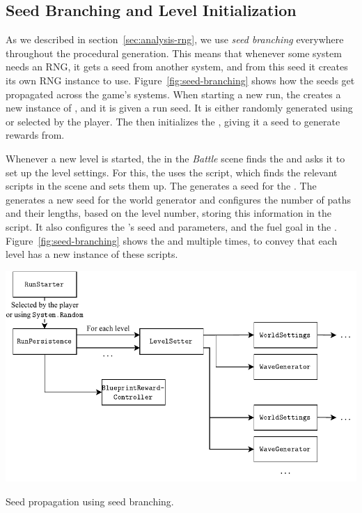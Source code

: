 \subsection{Seed Branching and Level Initialization}\label{sec:docs-level-init}

As we described in section~\ref{sec:analysis-rng}, we use \emph{seed branching} everywhere throughout the procedural generation.
This means that whenever some system needs an RNG, it gets a seed from another system, and from this seed it creates its own RNG instance to use.
Figure~\ref{fig:seed-branching} shows how the seeds get propagated across the game's systems.
When starting a new run, the  creates a new instance of , and it is given a run seed.
It is either randomly generated using  or selected by the player.
The  then initializes the , giving it a seed to generate rewards from.

Whenever a new level is started, the  in the \emph{Battle} scene finds the  and asks it to set up the level settings.
For this, the  uses the  script, which finds the relevant scripts in the scene and sets them up.
The  generates a seed for the .
The  generates a new seed for the world generator and configures the number of paths and their lengths, based on the level number, storing this information in the  script.
It also configures the 's seed and parameters, and the fuel goal in the .
Figure~\ref{fig:seed-branching} shows the  and  multiple times, to convey that each level has a new instance of these scripts.

\begin{center}
    \captionsetup{type=figure}
    \includegraphics[width=\textwidth]{img/seed splitting.pdf}
    \caption{Seed propagation using seed branching.}
    \label{fig:seed-branching}
\end{center}

